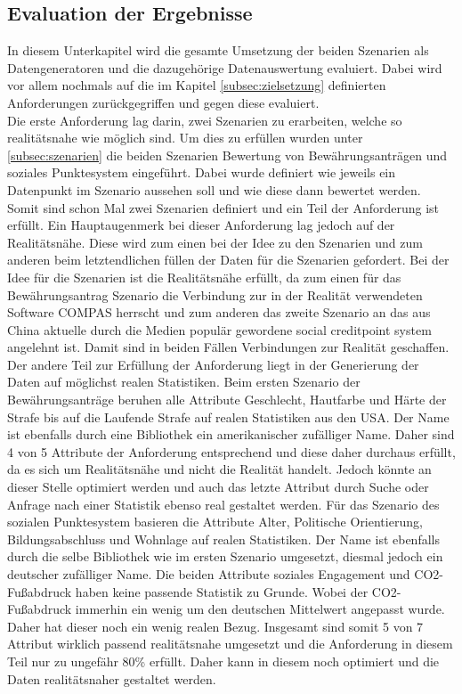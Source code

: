 \begin{onehalfspace}
\section{Evaluation der Ergebnisse}
\label{evaluation}
In diesem Unterkapitel wird die gesamte Umsetzung der beiden Szenarien als Datengeneratoren und die dazugehörige Datenauswertung evaluiert. Dabei wird vor allem nochmals auf die im Kapitel \ref{subsec:zielsetzung} definierten Anforderungen zurückgegriffen und gegen diese evaluiert.\\
Die erste Anforderung lag darin, zwei Szenarien zu erarbeiten, welche so realitätsnahe wie möglich sind. Um dies zu erfüllen wurden unter \ref{subsec:szenarien} die beiden Szenarien Bewertung von Bewährungsanträgen und soziales Punktesystem eingeführt. Dabei wurde definiert wie jeweils ein Datenpunkt im Szenario aussehen soll und wie diese dann bewertet werden. Somit sind schon Mal zwei Szenarien definiert und ein Teil der Anforderung ist erfüllt. Ein Hauptaugenmerk bei dieser Anforderung lag jedoch auf der Realitätsnähe. Diese wird zum einen bei der Idee zu den Szenarien und zum anderen beim letztendlichen füllen der Daten für die Szenarien gefordert. Bei der Idee für die Szenarien ist die Realitätsnähe erfüllt, da zum einen für das Bewährungsantrag Szenario die Verbindung zur in der Realität verwendeten Software \glqq{}COMPAS\grqq{} herrscht und zum anderen das zweite Szenario an das aus China aktuelle durch die Medien populär gewordene social creditpoint system angelehnt ist. Damit sind in beiden Fällen Verbindungen zur Realität geschaffen. Der andere Teil zur Erfüllung der Anforderung liegt in der Generierung der Daten auf möglichst realen Statistiken. Beim ersten Szenario der Bewährungsanträge beruhen alle Attribute Geschlecht, Hautfarbe und Härte der Strafe bis auf die Laufende Strafe auf realen Statistiken aus den USA. Der Name ist ebenfalls durch eine Bibliothek ein amerikanischer zufälliger Name. Daher sind 4 von 5 Attribute der Anforderung entsprechend und diese daher durchaus erfüllt, da es sich um Realitätsnähe und nicht die Realität handelt. Jedoch könnte an dieser Stelle optimiert werden und auch das letzte Attribut durch Suche oder Anfrage nach einer Statistik ebenso real gestaltet werden. Für das Szenario des sozialen Punktesystem basieren die Attribute Alter, Politische Orientierung, Bildungsabschluss und Wohnlage auf realen Statistiken. Der Name ist ebenfalls durch die selbe Bibliothek wie im ersten Szenario umgesetzt, diesmal jedoch ein deutscher zufälliger Name. Die beiden Attribute soziales Engagement und CO2-Fußabdruck haben keine passende Statistik zu Grunde. Wobei der CO2-Fußabdruck immerhin ein wenig um den deutschen Mittelwert angepasst wurde. Daher hat dieser noch ein wenig realen Bezug. Insgesamt sind somit 5 von 7 Attribut wirklich passend realitätsnahe umgesetzt und die Anforderung in diesem Teil nur zu ungefähr 80\% erfüllt. Daher kann in diesem noch optimiert und die Daten realitätsnaher gestaltet werden.\\

\end{onehalfspace}
